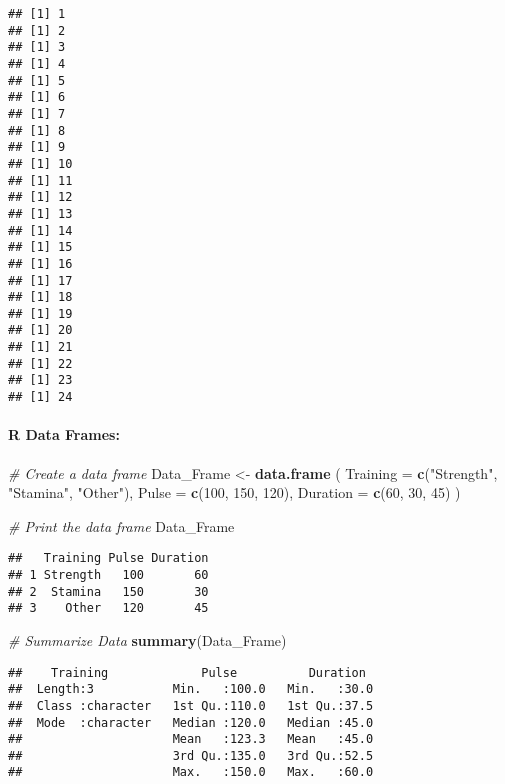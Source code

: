 \documentclass[
]{article}
\newenvironment{Shaded}{\begin{snugshade}}{\end{snugshade}}
\newcommand{\AttributeTok}[1]{\textcolor[rgb]{0.13,0.29,0.53}{#1}}
\newcommand{\CommentTok}[1]{\textcolor[rgb]{0.56,0.35,0.01}{\textit{#1}}}
\newcommand{\DecValTok}[1]{\textcolor[rgb]{0.00,0.00,0.81}{#1}}
\newcommand{\FunctionTok}[1]{\textcolor[rgb]{0.13,0.29,0.53}{\textbf{#1}}}
\newcommand{\NormalTok}[1]{#1}
\newcommand{\OtherTok}[1]{\textcolor[rgb]{0.56,0.35,0.01}{#1}}
\newcommand{\StringTok}[1]{\textcolor[rgb]{0.31,0.60,0.02}{#1}}
\begin{document}
\begin{verbatim}
## [1] 1
## [1] 2
## [1] 3
## [1] 4
## [1] 5
## [1] 6
## [1] 7
## [1] 8
## [1] 9
## [1] 10
## [1] 11
## [1] 12
## [1] 13
## [1] 14
## [1] 15
## [1] 16
## [1] 17
## [1] 18
## [1] 19
## [1] 20
## [1] 21
## [1] 22
## [1] 23
## [1] 24
\end{verbatim}

\hypertarget{r-data-frames}{%
\paragraph{R Data Frames:}\label{r-data-frames}}

\begin{Shaded}
\begin{Highlighting}[]
\CommentTok{\# Create a data frame}
\NormalTok{Data\_Frame }\OtherTok{\textless{}{-}} \FunctionTok{data.frame}\NormalTok{ (}
  \AttributeTok{Training =} \FunctionTok{c}\NormalTok{(}\StringTok{"Strength"}\NormalTok{, }\StringTok{"Stamina"}\NormalTok{, }\StringTok{"Other"}\NormalTok{),}
  \AttributeTok{Pulse =} \FunctionTok{c}\NormalTok{(}\DecValTok{100}\NormalTok{, }\DecValTok{150}\NormalTok{, }\DecValTok{120}\NormalTok{),}
  \AttributeTok{Duration =} \FunctionTok{c}\NormalTok{(}\DecValTok{60}\NormalTok{, }\DecValTok{30}\NormalTok{, }\DecValTok{45}\NormalTok{)}
\NormalTok{)}

\CommentTok{\# Print the data frame}
\NormalTok{Data\_Frame}
\end{Highlighting}
\end{Shaded}

\begin{verbatim}
##   Training Pulse Duration
## 1 Strength   100       60
## 2  Stamina   150       30
## 3    Other   120       45
\end{verbatim}

\begin{Shaded}
\begin{Highlighting}[]
\CommentTok{\# Summarize Data}
\FunctionTok{summary}\NormalTok{(Data\_Frame)}
\end{Highlighting}
\end{Shaded}

\begin{verbatim}
##    Training             Pulse          Duration   
##  Length:3           Min.   :100.0   Min.   :30.0  
##  Class :character   1st Qu.:110.0   1st Qu.:37.5  
##  Mode  :character   Median :120.0   Median :45.0  
##                     Mean   :123.3   Mean   :45.0  
##                     3rd Qu.:135.0   3rd Qu.:52.5  
##                     Max.   :150.0   Max.   :60.0
\end{verbatim}
\end{document}
